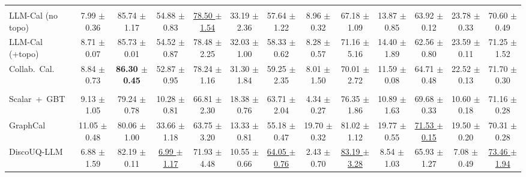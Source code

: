 \begin{table}[!t]
{\begin{tabular}{l c c c c c c c c c c c c}
\midrule
\rowcolor{gray!20}
\multicolumn{13}{c}{\textit{LLM-elicited confidence estimators}}\\
LLM-Cal (no topo)  & 7.99 {\scriptsize $\pm$ 0.36} & 85.74 {\scriptsize $\pm$ 1.17} & 54.88 {\scriptsize $\pm$ 0.83} & \underline{78.50 {\scriptsize $\pm$ 1.54}} & 33.19 {\scriptsize $\pm$ 2.36} & 57.64 {\scriptsize $\pm$ 1.22} & 8.96 {\scriptsize $\pm$ 0.32} & 67.18 {\scriptsize $\pm$ 1.09} & 13.87 {\scriptsize $\pm$ 0.85} & 63.92 {\scriptsize $\pm$ 0.12} & 23.78 {\scriptsize $\pm$ 0.33} & 70.60 {\scriptsize $\pm$ 0.49} \\
LLM-Cal (+topo)    & 8.71 {\scriptsize $\pm$ 0.07} & 85.73 {\scriptsize $\pm$ 0.01} & 54.52 {\scriptsize $\pm$ 0.87} & 78.48 {\scriptsize $\pm$ 2.25} & 32.03 {\scriptsize $\pm$ 1.00} & 58.33 {\scriptsize $\pm$ 0.62} & 8.28 {\scriptsize $\pm$ 0.57} & 71.16 {\scriptsize $\pm$ 5.16} & 14.40 {\scriptsize $\pm$ 1.89} & 62.56 {\scriptsize $\pm$ 0.80} & 23.59 {\scriptsize $\pm$ 0.11} & 71.25 {\scriptsize $\pm$ 1.52} \\
Collab.~Cal.       & 8.84 {\scriptsize $\pm$ 0.73} & \textbf{86.30 {\scriptsize $\pm$ 0.45}} & 52.87 {\scriptsize $\pm$ 0.95} & 78.24 {\scriptsize $\pm$ 1.16} & 31.30 {\scriptsize $\pm$ 1.84} & 59.25 {\scriptsize $\pm$ 2.35} & 8.01 {\scriptsize $\pm$ 1.50} & 70.01 {\scriptsize $\pm$ 2.72} & 11.59 {\scriptsize $\pm$ 0.08} & 64.71 {\scriptsize $\pm$ 0.48} & 22.52 {\scriptsize $\pm$ 0.13} & 71.70 {\scriptsize $\pm$ 0.30} \\
\midrule
\rowcolor{gray!20}
\multicolumn{13}{c}{\textit{Trained calibrators}}\\
Scalar~+~GBT       & 9.13 {\scriptsize $\pm$ 1.05} & 79.24 {\scriptsize $\pm$ 0.78} & 10.28 {\scriptsize $\pm$ 0.81} & 66.81 {\scriptsize $\pm$ 2.30} & 18.38 {\scriptsize $\pm$ 0.76} & 63.71 {\scriptsize $\pm$ 2.04} & 4.34 {\scriptsize $\pm$ 0.27} & 76.35 {\scriptsize $\pm$ 1.86} & 10.89 {\scriptsize $\pm$ 1.63} & 69.68 {\scriptsize $\pm$ 0.33} & 10.60 {\scriptsize $\pm$ 0.18} & 71.16 {\scriptsize $\pm$ 0.28} \\
GraphCal           & 11.05 {\scriptsize $\pm$ 0.48} & 80.06 {\scriptsize $\pm$ 1.00} & 33.66 {\scriptsize $\pm$ 1.18} & 63.75 {\scriptsize $\pm$ 3.20} & 13.33 {\scriptsize $\pm$ 0.81} & 55.18 {\scriptsize $\pm$ 0.47} & 19.70 {\scriptsize $\pm$ 0.32} & 81.02 {\scriptsize $\pm$ 1.12} & 19.77 {\scriptsize $\pm$ 0.55} & \underline{71.53 {\scriptsize $\pm$ 0.15}} & 19.50 {\scriptsize $\pm$ 0.20} & 70.31 {\scriptsize $\pm$ 0.28} \\
DiscoUQ-LLM        & 6.88 {\scriptsize $\pm$ 1.59} & 82.19 {\scriptsize $\pm$ 0.11} & \underline{6.99 {\scriptsize $\pm$ 1.17}} & 71.93 {\scriptsize $\pm$ 4.48} & 10.55 {\scriptsize $\pm$ 0.66} & \underline{64.05 {\scriptsize $\pm$ 0.76}} & 2.43 {\scriptsize $\pm$ 0.70} & \underline{83.19 {\scriptsize $\pm$ 3.28}} & 8.54 {\scriptsize $\pm$ 1.03} & 65.93 {\scriptsize $\pm$ 1.27} & 7.08 {\scriptsize $\pm$ 0.49} & \underline{73.46 {\scriptsize $\pm$ 1.94}} \\

\end{tabular}}
\end{table}
